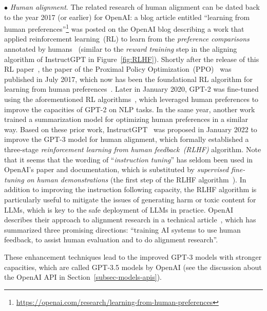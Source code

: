 $\bullet$ \emph{Human alignment}. The related research of human alignment can be dated back to the year 2017 (or earlier) for OpenAI: a blog article entitled ``learning from human preferences''\footnote{\url{https://openai.com/research/learning-from-human-preferences}} was posted on the OpenAI blog describing a work that applied   reinforcement learning~(RL) to learn from the \emph{preference comparisons}  annotated by  humans~\cite{Christiano-NeurIPS-2017-Deep} (similar to the \emph{reward training}  step in the aligning algorithm of InstructGPT in Figure~\ref{fig:RLHF}). 
Shortly after the release of this RL paper~\cite{Christiano-NeurIPS-2017-Deep}, the paper of the Proximal Policy Optimization~(PPO)~\cite{schulman-arxiv-2017-proximal} was published in July 2017, which now has been the foundational RL algorithm for learning from human preferences~\cite{Ouyang-arxiv-2022-Training}. 
Later in January 2020, GPT-2 was fine-tuned using the aforementioned RL algorithms~\cite{Christiano-NeurIPS-2017-Deep,schulman-arxiv-2017-proximal}, which leveraged human preferences to improve the capacities of GPT-2 on NLP tasks. In the same year, another work~\cite{Stiennon-arxiv-2020-learning} trained a summarization  model for optimizing  human preferences in a similar way. 
Based on these prior work, InstructGPT~\cite{Ouyang-arxiv-2022-Training} was proposed in January 2022 to improve the GPT-3 model for human alignment, which formally established a three-stage    \emph{reinforcement learning from human feedback~(RLHF)} algorithm. 
Note that it seems that the wording of ``\emph{instruction tuning}'' has seldom been used in OpenAI's paper and documentation, which is substituted by \emph{supervised fine-tuning on human demonstrations} (\ie the first step of the RLHF algorithm~\cite{Ouyang-arxiv-2022-Training}). 
In addition to improving the instruction following capacity, the RLHF algorithm is particularly useful to mitigate the issues of generating harm or toxic content for LLMs, which is key to the safe deployment of LLMs in practice. 
 OpenAI describes  their approach to alignment research in a technical article~\cite{OpenAI-blog-2022-alignment},  which has summarized three promising directions: ``training AI systems to use human feedback, to  assist human evaluation and to do  alignment research''.  

These enhancement techniques lead to the improved GPT-3 models with stronger capacities, which are called GPT-3.5 models  by OpenAI (see the discussion about the OpenAI API in Section~\ref{subsec-models-apis}).

